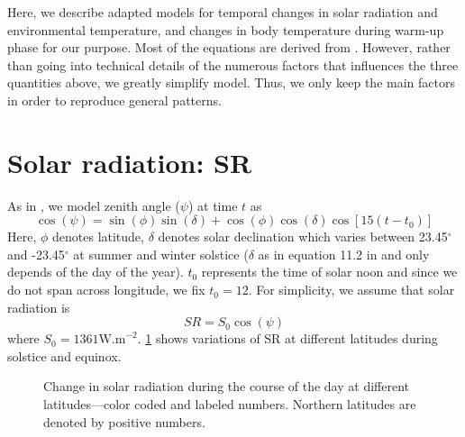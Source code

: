 \documentclass[12pt]{article}
\begin{document}
\maketitle
Here, we describe adapted models for temporal changes in solar radiation and environmental temperature, and changes in body temperature during warm-up phase for our purpose.
Most of the equations are derived from \citet{Campbell2012}. 
However, rather than going into technical details of the numerous factors that influences the three quantities above, we greatly simplify model. 
Thus, we only keep the main factors in order to reproduce general patterns. 

\section*{Solar radiation: SR}
As in \citet{Campbell2012}, we model zenith angle ($\psi$) at time $t$ as
\begin{equation}  \label{eq:psi}
\cos(\psi) = \sin(\phi) \sin(\delta) + \cos(\phi) \cos(\delta) \cos[15 (t- t_0)] 
\end{equation}
Here, $\phi$ denotes latitude, $\delta$ denotes solar declination which varies between 23.45$^\circ$ and  -23.45$^\circ$ at summer and winter solstice 
($\delta$ as in equation 11.2 in \citet{Campbell2012} and only depends of the day of the year). 
$t_0$ represents the time of solar noon and since we do not span across longitude, we fix $t_0 = 12$.
For simplicity, we assume that solar radiation is \[SR = S_0 \cos(\psi) \] where $S_0 = 1361 \mbox{W.m}^{-2}$. 
\cref{fig:rad} shows variations of SR at different latitudes during solstice and equinox.

\begin{figure}
\begin{center}
	\caption{Change in solar radiation during the course of the day at different latitudes---color coded and labeled numbers. 
	Northern latitudes are denoted by positive numbers.  
	}
	\label{fig:rad}
\end{center}
\end{figure}
\end{document}

